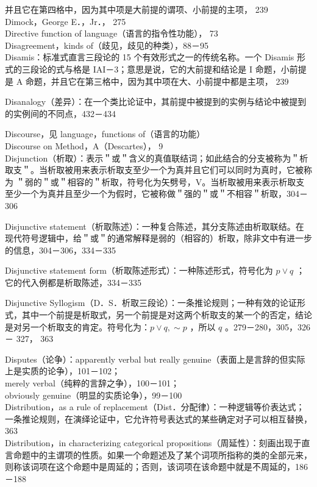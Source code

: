 并且它在第四格中，因为其中项是大前提的谓项、小前提的主项， 239\\
Dimock，George E．，Jr．， 275\\
Directive function of language（语言的指令性功能）， 73\\
Disagreement，kinds of（歧见，歧见的种类），88－95\\
Disamis：标准式直言三段论的 15 个有效形式之一的传统名称。一个 Disamis 形式的三段论的式与格是 IAI－3；意思是说，它的大前提和结论是 I 命题，小前提是 A 命题，并且它在第三格中，因为其中项在大、小前提中都是主项， 239

Disanalogy（差异）：在一个类比论证中，其前提中被提到的实例与结论中被提到的实例间的不同点，432－434

Discourse，见 language，functions of（语言的功能）\\
Discourse on Method，A（Descartes）， 9\\
Disjunction（析取）：表示＂或＂含义的真值联结词；如此结合的分支被称为＂析取支＂。当析取被用来表示析取支至少一个为真并且它们可以同时为真时，它被称为 ＂弱的＂或＂相容的＂析取，符号化为矢劈号，V。当析取被用来表示析取支至少一个为真并且至少一个为假时，它被称做＂强的＂或＂不相容＂析取，304－306

Disjunctive statement（析取陈述）：一种复合陈述，其分支陈述由析取联结。在现代符号逻辑中，给＂或＂的通常解释是弱的（相容的）析取，除非文中有进一步的信息，304－306，334－335

Disjunctive statement form（析取陈述形式）：一种陈述形式，符号化为 $p \vee q$ ；它的代入例都是析取陈述，334－335

Disjunctive Syllogism（D．S．析取三段论）：一条推论规则；一种有效的论证形式，其中一个前提是析取式，另一个前提是对这两个析取支的某一个的否定，结论是对另一个析取支的肯定。符号化为：$p \vee q, \sim p$ ，所以 $q$ 。279－280，305，326－ 327， 363

Disputes（论争）：apparently verbal but really genuine（表面上是言辞的但实际上是实质的论争），101－102；\\
merely verbal（纯粹的言辞之争），100－101；\\
obviously genuine（明显的实质论争），99－100\\
Distribution，as a rule of replacement（Dist．分配律）：一种逻辑等价表达式；一条推论规则，在演绎论证中，它允许符号表达式的某些确定对子可以相互替换， 363\\
Distribution，in characterizing categorical propositions（周延性）：刻画出现于直言命题中的主谓项的性质。如果一个命题述及了某个词项所指称的类的全部元来，则称该词项在这个命题中是周延的；否则，该词项在该命题中就是不周延的，186－188

